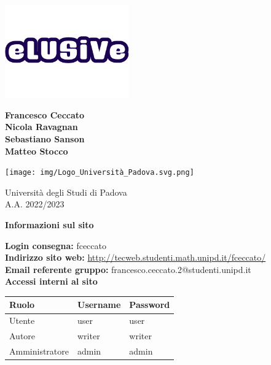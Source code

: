 \documentclass[11pt, a4paper]{article}
\begin{document}
\begin{titlepage}
    \begin{center}
        \vspace*{1cm}
        
        \includegraphics[width=0.4\textwidth]{img/logo.png}
            
        \vspace{0.5cm}
        
        \Large
        \textbf{Francesco Ceccato} \\
        \textbf{Nicola Ravagnan} \\
        \textbf{Sebastiano Sanson} \\
        \textbf{Matteo Stocco}
            
        \vfill
            
        \vspace{0.8cm}
            
        \texttt{[image: img/Logo\_Università\_Padova.svg.png]}
            
        \Large
        Università degli Studi di Padova \\
        A.A. 2022/2023
            
    \end{center}
\end{titlepage}


\clearpage

\begin{center}
	\textbf{\Large{Informazioni sul sito}}

    \vspace{0.5cm}

	\textbf{Login consegna:} fceccato \\
	\textbf{Indirizzo sito web:} \url{http://tecweb.studenti.math.unipd.it/fceccato/}\\
	\textbf{Email referente gruppo:} francesco.ceccato.2@studenti.unipd.it \\
    \vspace{1cm}
    \textbf{Accessi interni al sito}
    \begin{longtable}{|l|l|l|}
        \hline
        \rowcolor[HTML]{220058}
        {\color[HTML]{FFFFFF} Ruolo} & {\color[HTML]{FFFFFF} Username} & {\color[HTML]{FFFFFF} Password} \\ \hline
        Utente         & user     & user    \\ \hline
        Autore         & writer   & writer  \\ \hline
        Amministratore & admin    & admin   \\ \hline
    \end{longtable}
\end{center}
\end{document}
